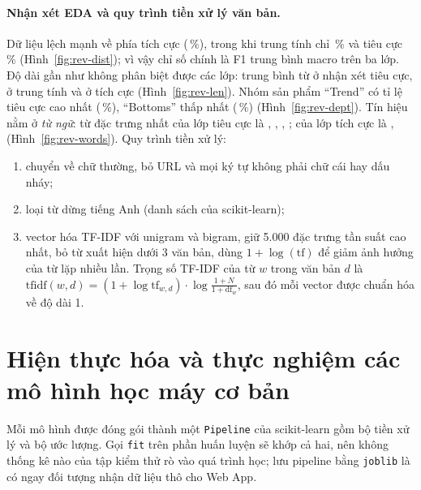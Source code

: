 \paragraph{Nhận xét EDA và quy trình tiền xử lý văn bản.} Dữ liệu lệch mạnh về phía tích cực
(\,\%), trong khi trung tính chỉ \,\% và tiêu cực
\,\% (Hình~\ref{fig:rev-dist}); vì vậy chỉ số chính là F1 trung bình macro trên ba lớp.
Độ dài gần như không phân biệt được các lớp: trung bình  từ ở nhận xét tiêu cực,
 ở trung tính và  ở tích cực (Hình~\ref{fig:rev-len}).
Nhóm sản phẩm “Trend” có tỉ lệ tiêu cực cao nhất (\,\%), “Bottoms” thấp nhất
(\,\%) (Hình~\ref{fig:rev-dept}). Tín hiệu nằm ở \emph{từ ngữ}: từ đặc trưng nhất
của lớp tiêu cực là \emph{}, \emph{}, \emph{},
\emph{}; của lớp tích cực là \emph{}, \emph{}
(Hình~\ref{fig:rev-words}). Quy trình tiền xử lý:
\begin{enumerate}
  \item chuyển về chữ thường, bỏ URL và mọi ký tự không phải chữ cái hay dấu nháy;
  \item loại từ dừng tiếng Anh (danh sách của scikit-learn);
  \item vector hóa TF-IDF với unigram và bigram, giữ 5.000 đặc trưng tần suất cao nhất, bỏ từ xuất hiện dưới 3 văn bản,
    dùng $1 + \log(\text{tf})$ để giảm ảnh hưởng của từ lặp nhiều lần. Trọng số TF-IDF của từ $w$ trong văn bản $d$ là
    $\mathrm{tfidf}(w, d) = (1 + \log \mathrm{tf}_{w,d}) \cdot \log\frac{1 + N}{1 + \mathrm{df}_w}$, sau đó mỗi vector được
    chuẩn hóa về độ dài 1.
\end{enumerate}

\section{Hiện thực hóa và thực nghiệm các mô hình học máy cơ bản}

Mỗi mô hình được đóng gói thành một \texttt{Pipeline} của scikit-learn \cite{pedregosa2011} gồm bộ tiền xử lý và bộ ước
lượng. Gọi \texttt{fit} trên phần huấn luyện sẽ khớp cả hai, nên không thống kê nào của tập kiểm thử rò vào quá trình
học; lưu pipeline bằng \texttt{joblib} là có ngay đối tượng nhận dữ liệu thô cho Web App.

